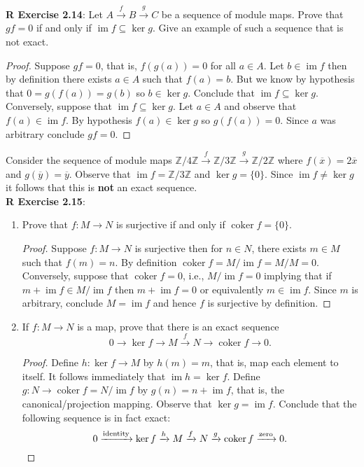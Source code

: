 \documentclass[8pt]{amsart}
\theoremstyle{plain}%
\theoremstyle{definition}
\theoremstyle{remark}
\numberwithin{equation}{section}
\newcommand{\Z}{\mathbb{Z}}
\newcommand{\im}{\operatorname{im}}
\newcommand{\coker}{\operatorname{coker}}
\begin{document}
\textbf{R Exercise 2.14}: Let $A \xrightarrow f B \xrightarrow g C$ be a sequence of module maps. Prove that $gf = 0$ if and only if $\im f \subseteq \ker g$.  Give an example of such a sequence that is not exact.
	\begin{proof}
		Suppose $gf = 0$, that is, $f(g(a)) = 0$ for all $a \in A$. Let $b \in \im f$ then by definition there exists $a \in A$ such that $f(a) = b$. But we know by hypothesis that $0 = g(f(a)) = g(b)$ so $b \in \ker g$. Conclude that $\im f \subseteq \ker g$. Conversely, suppose that $\im f \subseteq \ker g$. Let $a \in A$ and observe that $f(a) \in \im f$. By hypothesis $f(a) \in \ker g$ so $g(f(a)) = 0$. Since $a$ was arbitrary conclude $gf = 0$.
	\end{proof}
	Consider the sequence of module maps $\Z/4\Z \xrightarrow f \Z/3\Z \xrightarrow g \Z/2\Z$ where $f(\overline x) = 2 \overline x$ and $g(\overline y) = \overline y$. Observe that $\im f = \Z/3\Z$  and $\ker g = \{0\}$. Since $\im f \neq \ker g$ it follows that this is \textbf{not} an exact sequence.\\

\textbf{R Exercise 2.15}:
	\begin{enumerate}
		\item Prove that $f : M \to N$ is surjective if and only if $\coker f = \{0\}$.
			\begin{proof}
				Suppose $f : M \to N$ is surjective then for $n \in N$, there exists $m \in M$ such that $f(m) = n$. By definition $\coker f = M/\im f = M/M = 0$. Conversely, suppose that $\coker f = 0$, i.e., $M/\im f = 0$ implying that if $m + \im f \in M/\im f$ then $m + \im f = 0$ or equivalently $m \in \im f$. Since $m$ is arbitrary, conclude $M = \im f$ and hence $f$ is surjective by definition.
			\end{proof}
		\item If $f : M \to N$ is a map, prove that there is an exact sequence $$ 0 \rightarrow \ker f \rightarrow M \xrightarrow f N \rightarrow \coker f \rightarrow 0.$$
			\begin{proof}
				Define $h : \ker f \to M$ by $h(m) = m$, that is, map each element to itself. It follows immediately that $\im h = \ker f$. Define $g : N \to \coker f = N/\im f$ by $g(n) = n + \im f$, that is, the canonical/projection mapping. Observe that $\ker g = \im f$. Conclude that the following sequence is in fact exact: $$0 \xrightarrow{\text{identity}} \ker f \xrightarrow h M \xrightarrow f N \xrightarrow g \coker f \xrightarrow{\text{zero}} 0. \qedhere$$
			\end{proof}
	\end{enumerate}
\end{document}
